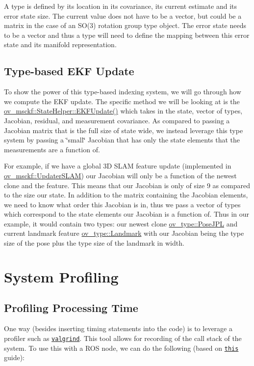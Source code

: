 A type is defined by its location in its covariance, its current estimate and its error state size. The current value does not have to be a vector, but could be a matrix in the case of an S\+O(3) rotation group type object. The error state needs to be a vector and thus a type will need to define the mapping between this error state and its manifold representation.\hypertarget{dev-index_dev-index-update}{}\subsection{Type-\/based E\+K\+F Update}\label{dev-index_dev-index-update}
To show the power of this type-\/based indexing system, we will go through how we compute the E\+KF update. The specific method we will be looking at is the \hyperlink{classov__msckf_1_1StateHelper_a471d81fcc22b706654556950931067fd}{ov\+\_\+msckf\+::\+State\+Helper\+::\+E\+K\+F\+Update()} which takes in the state, vector of types, Jacobian, residual, and measurement covariance. As compared to passing a Jacobian matrix that is the full size of state wide, we instead leverage this type system by passing a \char`\"{}small\char`\"{} Jacobian that has only the state elements that the measurements are a function of.

For example, if we have a global 3D S\+L\+AM feature update (implemented in \hyperlink{classov__msckf_1_1UpdaterSLAM}{ov\+\_\+msckf\+::\+Updater\+S\+L\+AM}) our Jacobian will only be a function of the newest clone and the feature. This means that our Jacobian is only of size 9 as compared to the size our state. In addition to the matrix containing the Jacobian elements, we need to know what order this Jacobian is in, thus we pass a vector of types which correspond to the state elements our Jacobian is a function of. Thus in our example, it would contain two types\+: our newest clone \hyperlink{classov__type_1_1PoseJPL}{ov\+\_\+type\+::\+Pose\+J\+PL} and current landmark feature \hyperlink{classov__type_1_1Landmark}{ov\+\_\+type\+::\+Landmark} with our Jacobian being the type size of the pose plus the type size of the landmark in width. \hypertarget{dev-profiling}{}\section{System Profiling}\label{dev-profiling}
\hypertarget{dev-profiling_dev-profiling-compute}{}\subsection{Profiling Processing Time}\label{dev-profiling_dev-profiling-compute}
One way (besides inserting timing statements into the code) is to leverage a profiler such as \href{https://www.valgrind.org/}{\tt valgrind}. This tool allows for recording of the call stack of the system. To use this with a R\+OS node, we can do the following (based on \href{http://wiki.ros.org/roslaunch/Tutorials/Roslaunch%20Nodes%20in%20Valgrind%20or%20GDB}{\tt this} guide)\+:


